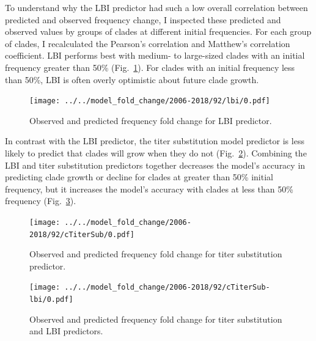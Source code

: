 \documentclass[12pt]{article}
\begin{document}
To understand why the LBI predictor had such a low overall correlation between predicted and observed frequency change, I inspected these predicted and observed values by groups of clades at different initial frequencies.
For each group of clades, I recalculated the Pearson's correlation and Matthew's correlation coefficient.
LBI performs best with medium- to large-sized clades with an initial frequency greater than 50\% (Fig.~\ref{fig:model-fold-change-lbi}).
For clades with an initial frequency less than 50\%, LBI is often overly optimistic about future clade growth.

\begin{figure}
\texttt{[image: ../../model\_fold\_change/2006-2018/92/lbi/0.pdf]}
\caption{\label{fig:model-fold-change-lbi}Observed and predicted frequency fold change for LBI predictor.}
\end{figure}

In contrast with the LBI predictor, the titer substitution model predictor is less likely to predict that clades will grow when they do not (Fig.~\ref{fig:model-fold-change-cTiterSub}).
Combining the LBI and titer substitution predictors together decreases the model's accuracy in predicting clade growth or decline for clades at greater than 50\% initial frequency, but it increases the model's accuracy with clades at less than 50\% frequency (Fig.~\ref{fig:model-fold-change-cTiterSub-lbi}).

\begin{figure}
\texttt{[image: ../../model\_fold\_change/2006-2018/92/cTiterSub/0.pdf]}
\caption{\label{fig:model-fold-change-cTiterSub}Observed and predicted frequency fold change for titer substitution predictor.}
\end{figure}

\begin{figure}
\texttt{[image: ../../model\_fold\_change/2006-2018/92/cTiterSub-lbi/0.pdf]}
\caption{\label{fig:model-fold-change-cTiterSub-lbi}Observed and predicted frequency fold change for titer substitution and LBI predictors.}
\end{figure}
\end{document}
